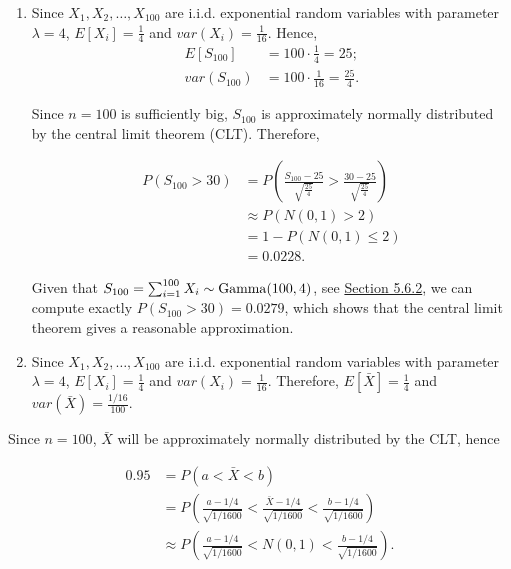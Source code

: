 \documentclass[
]{book}
\begin{document}
\begin{enumerate}
\def\labelenumi{(\alph{enumi})}
\item
  Since \(X_1,X_2,\dots,X_{100}\) are i.i.d. exponential random variables with parameter \(\lambda=4\), \(E\left[X_i\right]=\frac{1}{4}\) and \(var(X_i) = \frac{1}{16}\). Hence,\\

  \begin{align*}
  E \left[ S_{100} \right] &= 100 \cdot \frac{1}{4} = 25; \\
  var(S_{100}) &= 100 \cdot \frac{1}{16} = \frac{25}{4}.
  \end{align*}

  Since \(n=100\) is sufficiently big, \(S_{100}\) is approximately normally distributed by the central limit theorem (CLT). Therefore,

  \begin{align*}
  P(S_{100} > 30) &= P \left( \frac{S_{100}-25}{\sqrt{\frac{25}{4}}} > \frac{30-25}{\sqrt{\frac{25}{4}}} \right) \\
  &\approx P( N(0,1) >2) \\
  &= 1 - P( N(0,1) \leq 2) \\
  &= 0.0228.
  \end{align*}

  Given that \(S_{100} = \sum_{i=1}^{100} X_i \sim {\rm Gamma} (100,4)\), see \protect\hyperlink{rv:exponential:gamma}{Section 5.6.2}, we can compute exactly \(P(S_{100} >30) = 0.0279\), which shows that the central limit theorem gives a reasonable approximation.
\item
  Since \(X_1,X_2,\dots,X_{100}\) are i.i.d. exponential random variables with parameter \(\lambda=4\), \(E\left[X_i\right]=\frac{1}{4}\) and \(var (X_i) = \frac{1}{16}\). Therefore, \(E\left[\bar{X}\right] = \frac{1}{4}\) and \(var(\bar{X}) = \frac{1/16}{100}\).
\end{enumerate}

Since \(n=100\), \(\bar{X}\) will be approximately normally distributed by the CLT, hence

\begin{align*}
0.95 &= P(a < \bar{X} < b) \\
&= P \left( \frac{a-1/4}{\sqrt{1/1600}} < \frac{\bar{X}-1/4}{\sqrt{1/1600}} < \frac{b-1/4}{\sqrt{1/1600}} \right) \\
&\approx P \left( \frac{a-1/4}{\sqrt{1/1600}} < N(0,1) < \frac{b-1/4}{\sqrt{1/1600}} \right). \\
\end{align*}
\end{document}
